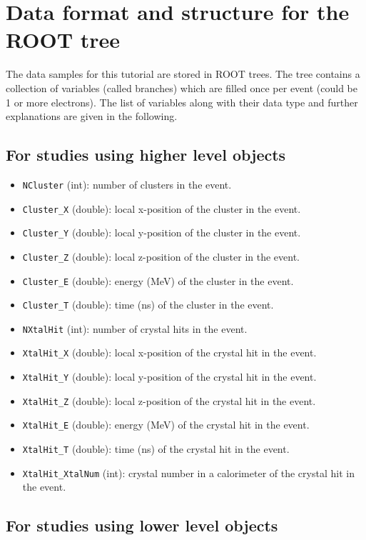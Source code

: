 \documentclass[12pt,letterpaper]{article}
\begin{document}
\section{Data format and structure for the ROOT tree}
The data samples for this tutorial are stored in ROOT trees. The tree contains a collection of variables (called branches) which are filled once per event (could be 1 or more electrons). The list of variables along with their
data type and further explanations are given in the following. 

\subsection*{For studies using higher level objects}

\begin{itemize}
\item \verb+NCluster+ (int): number of clusters in the event.
\item \verb+Cluster_X+ (double): local x-position of the cluster in the event. 
\item \verb+Cluster_Y+ (double): local y-position of the cluster in the event. 
\item \verb+Cluster_Z+ (double): local z-position of the cluster in the event. 
\item \verb+Cluster_E+ (double): energy (MeV) of the cluster in the event. 
\item \verb+Cluster_T+ (double): time (ns) of the cluster in the event. 

\item \verb+NXtalHit+ (int): number of crystal hits in the event.
\item \verb+XtalHit_X+ (double): local x-position of the crystal hit in the event. 
\item \verb+XtalHit_Y+ (double): local y-position of the crystal hit in the event. 
\item \verb+XtalHit_Z+ (double): local z-position of the crystal hit in the event. 
\item \verb+XtalHit_E+ (double): energy (MeV) of the crystal hit in the event. 
\item \verb+XtalHit_T+ (double): time (ns) of the crystal hit in the event. 
\item \verb+XtalHit_XtalNum+ (int): crystal number in a calorimeter of the crystal hit in the event. 
\end{itemize}

\subsection*{For studies using lower level objects}
\end{document}
